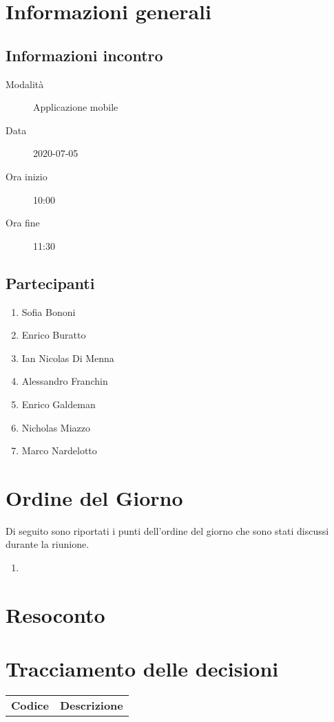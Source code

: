 \documentclass{article}
\begin{document}


\section{Informazioni generali}%
\label{sec:informazioni_generali}

\subsection{Informazioni incontro}%
\label{sub:informazioni_incontro}

\begin{description}
  \item[Modalità] Applicazione mobile 
  \item[Data] 2020-07-05
  \item[Ora inizio] 10:00
  \item[Ora fine] 11:30
\end{description}

\subsection{Partecipanti}%
\label{sub:partecipanti}

\begin{enumerate}
  \item Sofia Bononi
  \item Enrico Buratto
  \item Ian Nicolas Di Menna
  \item Alessandro Franchin
  \item Enrico Galdeman
  \item Nicholas Miazzo
  \item Marco Nardelotto
\end{enumerate}

\section{Ordine del Giorno}%
\label{ordine_del_giorno}
Di seguito sono riportati i punti dell'ordine del giorno che sono stati discussi durante la riunione.
\begin{enumerate}
  \item 
\end{enumerate}

\section{Resoconto}%
\label{resoconto}


\section{Tracciamento delle decisioni}
\begin{table}[H]
  \centering
  \begin{tabular}{p{4cm}|p{12cm}}
    \rowcolor{lightgray}
    \textbf{Codice}  & \textbf{Descrizione}      \\
  \end{tabular}
\end{table}
\end{document}
